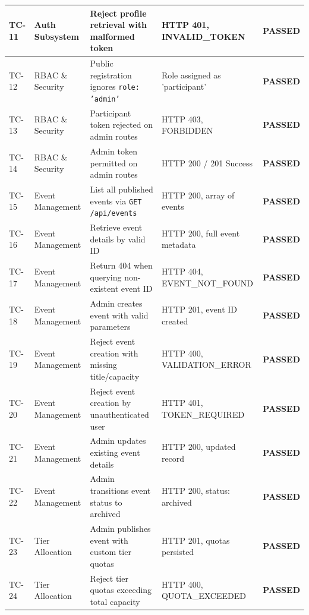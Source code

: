 \documentclass[11pt,a4paper]{report}
\begin{document}
\begin{table}[H]
\begin{tabularx}{\textwidth}{|p{}|p{}|p{}|p{}|X|}
TC-11 & Auth Subsystem & Reject profile retrieval with malformed token & HTTP 401, INVALID\_TOKEN & \color{SuccessGreen}\textbf{PASSED} \\\hline
TC-12 & RBAC \& Security & Public registration ignores \texttt{role: 'admin'} & Role assigned as 'participant' & \color{SuccessGreen}\textbf{PASSED} \\\hline
TC-13 & RBAC \& Security & Participant token rejected on admin routes & HTTP 403, FORBIDDEN & \color{SuccessGreen}\textbf{PASSED} \\\hline
TC-14 & RBAC \& Security & Admin token permitted on admin routes & HTTP 200 / 201 Success & \color{SuccessGreen}\textbf{PASSED} \\\hline
TC-15 & Event Management & List all published events via \texttt{GET /api/events} & HTTP 200, array of events & \color{SuccessGreen}\textbf{PASSED} \\\hline
TC-16 & Event Management & Retrieve event details by valid ID & HTTP 200, full event metadata & \color{SuccessGreen}\textbf{PASSED} \\\hline
TC-17 & Event Management & Return 404 when querying non-existent event ID & HTTP 404, EVENT\_NOT\_FOUND & \color{SuccessGreen}\textbf{PASSED} \\\hline
TC-18 & Event Management & Admin creates event with valid parameters & HTTP 201, event ID created & \color{SuccessGreen}\textbf{PASSED} \\\hline
TC-19 & Event Management & Reject event creation with missing title/capacity & HTTP 400, VALIDATION\_ERROR & \color{SuccessGreen}\textbf{PASSED} \\\hline
TC-20 & Event Management & Reject event creation by unauthenticated user & HTTP 401, TOKEN\_REQUIRED & \color{SuccessGreen}\textbf{PASSED} \\\hline
TC-21 & Event Management & Admin updates existing event details & HTTP 200, updated record & \color{SuccessGreen}\textbf{PASSED} \\\hline
TC-22 & Event Management & Admin transitions event status to archived & HTTP 200, status: archived & \color{SuccessGreen}\textbf{PASSED} \\\hline
TC-23 & Tier Allocation & Admin publishes event with custom tier quotas & HTTP 201, quotas persisted & \color{SuccessGreen}\textbf{PASSED} \\\hline
TC-24 & Tier Allocation & Reject tier quotas exceeding total capacity & HTTP 400, QUOTA\_EXCEEDED & \color{SuccessGreen}\textbf{PASSED} \\\hline

\end{tabularx}
\end{table}
\end{document}
